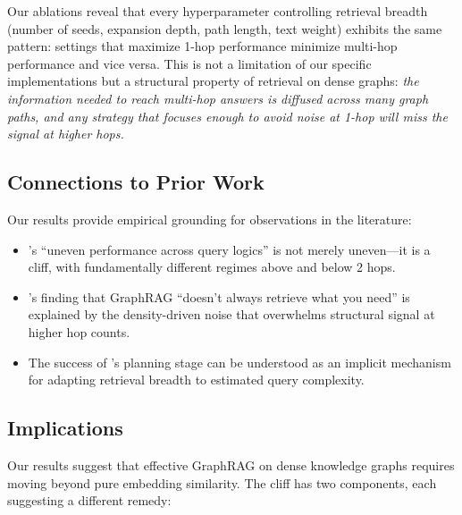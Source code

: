 \documentclass[11pt]{article}
\begin{document}
Our ablations reveal that every hyperparameter controlling retrieval breadth (number of seeds, expansion depth, path length, text weight) exhibits the same pattern: settings that maximize 1-hop performance minimize multi-hop performance and vice versa. This is not a limitation of our specific implementations but a structural property of retrieval on dense graphs: \textit{the information needed to reach multi-hop answers is diffused across many graph paths, and any strategy that focuses enough to avoid noise at 1-hop will miss the signal at higher hops.}

\subsection{Connections to Prior Work}

Our results provide empirical grounding for observations in the literature:
\begin{itemize}
    \item \citet{yue2025mor}'s ``uneven performance across query logics'' is not merely uneven---it is a cliff, with fundamentally different regimes above and below 2 hops.
    \item \citet{yu2025graphflow}'s finding that GraphRAG ``doesn't always retrieve what you need'' is explained by the density-driven noise that overwhelms structural signal at higher hop counts.
    \item The success of \citet{yue2025mor}'s planning stage can be understood as an implicit mechanism for adapting retrieval breadth to estimated query complexity.
\end{itemize}

\subsection{Implications}

Our results suggest that effective GraphRAG on dense knowledge graphs requires moving beyond pure embedding similarity. The cliff has two components, each suggesting a different remedy:
\end{document}
